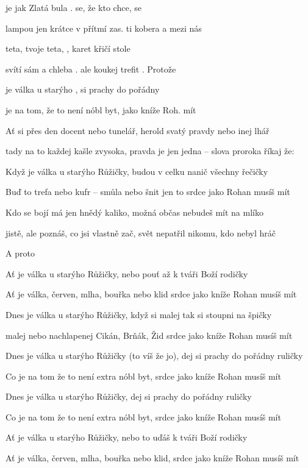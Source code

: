 

\zs
{} je jak Zlatá bula .
 se, že kto chce, se 

 lampou jen krátce v přítmí  zas.
 ti kobera a  mezi nás
 {}       
\ks

\zs
{} teta, tvoje teta, ,
 karet křičí  stole

 svítí sám a chleba .
 ale koukej trefit . Protože
\ks

\zr
{} je válka u starýho ,
 si prachy do pořádny 

 je na tom, že to není  nóbl byt, jako kníže Roh.  mít    
\kr

\zs
Ať si přes den docent nebo tunelář,
herold svatý pravdy nebo inej lhář

tady na to každej kašle zvysoka,
pravda je jen jedna -- slova proroka říkaj že:
\ks

\zr
Když je válka u starýho Růžičky,
budou v celku nanič všechny řečičky

Buď to trefa nebo kufr -- smůla nebo šnit
jen to srdce jako Rohan musíš mít
\kr

\zs
Kdo se bojí má jen hnědý kaliko,
možná občas nebudeš mít na mlíko

jistě, ale poznáš, co jsi vlastně zač,
svět nepatřil nikomu, kdo nebyl hráč

A proto
\ks

\zr
Ať je válka u starýho Růžičky,
nebo pouť až k tváři Boží rodičky

Ať je válka, červen, mlha, bouřka nebo klid
srdce jako kníže Rohan musíš mít
\kr

\zr
Dnes je válka u starýho Růžičky,
když si malej tak si stoupni na špičky

malej nebo nachlapenej Cikán, Brňák, Žid
srdce jako kníže Rohan musíš mít
\kr

\zr
Dnes je válka u starýho Růžičky (to víš že jo),
dej si prachy do pořádny ruličky

Co je na tom že to není extra nóbl byt,
srdce jako kníže Rohan musíš mít
\kr

\zr
Dnes je válka u starýho Růžičky,
dej si prachy do pořádny ruličky

Co je na tom že to není extra nóbl byt,
srdce jako kníže Rohan musíš mít
\kr

\zr
Ať je válka u starýho Růžičky,
nebo to uďáš k tváři Boží rodičky

Ať je válka, červen, mlha, bouřka nebo klid,
srdce jako kníže Rohan musíš mít
\kr

\kp






